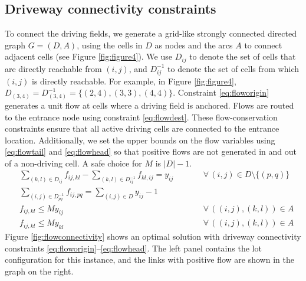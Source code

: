 \documentclass[10pt]{article}
\newcommand{\drivevar}[2]{y_{#1#2}}
\newcommand{\flowvar}[4]{f_{#1#2,#3#4}}
\newcommand{\validdriveset}{D}
\newcommand{\grid}{G}
\newcommand{\gridadjset}[2]{D_{#1#2}}
\newcommand{\gridinvadjset}[2]{D^{-1}_{#1#2}}
\newcommand{\gridarcset}{A}
\newcommand{\entrancex}{p}
\newcommand{\entrancey}{q}
\theoremstyle{definition}
\begin{document}
\subsection{Driveway connectivity constraints}
\label{sec:Driveway connectivity constraints}
To connect the driving fields, we generate a grid-like strongly connected directed graph $\grid = (\validdriveset, \gridarcset)$, using the cells in $\validdriveset$ as nodes and the arcs $\gridarcset$ to connect adjacent cells (see Figure \ref{fig:figure4}). We use $\gridadjset{i}{j}$ to denote the set of cells that are directly reachable from $(i,j)$, and $\gridinvadjset{i}{j}$ to denote the set of cells from which $(i,j)$ is directly reachable. For example, in Figure \ref{fig:figure4}, $\gridadjset{(3,}{4)} = \gridinvadjset{(3,}{4)} = \{(2,4), (3,3), (4,4)\}$. Constraint \eqref{eq:floworigin} generates a unit flow at cells where a driving field is anchored. Flows are routed to the entrance node using constraint \eqref{eq:flowdest}. These flow-conservation constraints ensure that all active driving cells are connected to the entrance location. Additionally, we set the upper bounds on the flow variables using \eqref{eq:flowtail} and \eqref{eq:flowhead} so that positive flows are not generated in and out of a non-driving cell. A safe choice for $M$ is $|\validdriveset|-1$.
\begin{align}
    & \sum_{(k,l) \in \gridadjset{i}{j}} \flowvar{i}{j}{k}{l} - \sum_{(k,l) \in \gridinvadjset{i}{j}} \flowvar{k}{l}{i}{j} = \drivevar{i}{j} \qquad && \forall \, (i,j) \in \validdriveset \setminus \{(\entrancex, \entrancey)\} \label{eq:floworigin}\\
    & \sum_{(i,j) \in \gridinvadjset{\entrancex}{\entrancey}} \flowvar{i}{j}{\entrancex}{\entrancey} = \sum_{(i,j) \in \validdriveset} \drivevar{i}{j} -1 \qquad &&  \label{eq:flowdest}\\
    & \flowvar{i}{j}{k}{l} \leq M \drivevar{i}{j} \qquad && \forall \, ((i,j), (k,l)) \in \gridarcset \label{eq:flowtail}\\
    & \flowvar{i}{j}{k}{l} \leq M \drivevar{k}{l} \qquad && \forall \, ((i,j), (k,l)) \in \gridarcset \label{eq:flowhead}
\end{align}
Figure \ref{fig:flowconnectivity} shows an optimal solution with driveway connectivity constraints \eqref{eq:floworigin}--\eqref{eq:flowhead}. The left panel contains the lot configuration for this instance, and the links with positive flow are shown in the graph on the right.
\end{document}
